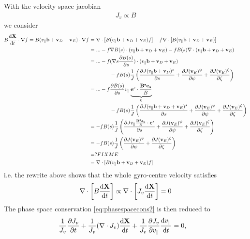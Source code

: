 With the velocity space jacobian
\begin{align}
  J_v \propto B
\end{align}
we consider
\begin{align}
B\frac{\mathrm{d} \mathbf{X}}{\mathrm{d} t}\cdot\nabla f = B ( v_\parallel {\bf b} + {\bf v}_D + {\bf v}_E ) \cdot \nabla f 
&=
\nabla \cdot [ B ( v_\parallel {\bf b} + {\bf v}_D + {\bf v}_E ) f ] - f\nabla \cdot [ B ( v_\parallel {\bf b} + {\bf v}_D + {\bf v}_E )] 
\\
&=
 ... - f\nabla B(s)\cdot ( v_\parallel {\bf b} + {\bf v}_D + {\bf v}_E ) - f B(s)\nabla\cdot ( v_\parallel {\bf b} + {\bf v}_D + {\bf v}_E )
\\
&=
 ... - f(\nabla s\frac{\partial B(s)}{\partial s}) \cdot ( v_\parallel {\bf b} + {\bf v}_D + {\bf v}_E )
\\
&\qquad\qquad
 - fB(s)\frac{1}{J}\left(
\frac{\partial J(v_\parallel {\bf b} + {\bf v}_D)^s}{\partial s} + \frac{\partial J({\bf v}_E)^\psi}{\partial \psi} + \frac{\partial J({\bf v}_E)^\zeta}{\partial \zeta} 
\right) 
\\
&=
 ... - f\frac{\partial B(s)}{\partial s} v_\parallel \underbrace{\mathbf{e}^s\cdot\frac{\mathbf{B^s\mathbf{e}_s}}{B}}_{0}
\\
&\qquad\qquad
 - fB(s)\frac{1}{J}\left(
\frac{\partial J(v_\parallel {\bf b} + {\bf v}_D + \mathbf{v}_E)^s}{\partial s} + \frac{\partial J({\bf v}_E)^\psi}{\partial \psi} + \frac{\partial J({\bf v}_E)^\zeta}{\partial \zeta} 
\right) 
\\
&=
 - fB(s)\frac{1}{J}\left(
\frac{\partial Jv_\parallel \frac{\mathbf{B^s\mathbf{e_s}}}{B}\cdot\mathbf{e}^s}{\partial s} + \frac{\partial J({\bf v}_E)^\psi}{\partial \psi} + \frac{\partial J({\bf v}_E)^\zeta}{\partial \zeta} 
\right) 
\\
&=
 - fB(s)\frac{1}{J}\left(
\frac{\partial J({\bf v}_E)^\psi}{\partial \psi} + \frac{\partial J({\bf v}_E)^\zeta}{\partial \zeta} 
\right) 
\\
&= ? FIXME
\\
&= \nabla \cdot [ B ( v_\parallel {\bf b} + {\bf v}_D + {\bf v}_E ) f ]
\end{align}
i.e. the rewrite above shows that the whole gyro-centre velocity satisfies 
\begin{equation}
 \nabla \cdot \left [ B \frac{\mathrm{d} \bf X}{\mathrm{d} t} \right ] \propto \nabla \cdot \left [ J_v \frac{\mathrm{d} \bf X}{\mathrm{d} t} \right ] = 0
\end{equation}
The phase space conservation \eqref{eq:phasespacecons2} is then reduced to
\begin{align}
  \frac{1 }{ J_v} \frac{\partial J_v}{\partial  t} 
+ \frac{1 }{ J_v} (\nabla \cdot  J_v) \frac{\mathrm{d} \bf X}{\mathrm{d} t} 
 + \frac{1 }{ J_v}\frac{\partial J_v}{\partial  v_\parallel}  \frac{\mathrm{d} v_\parallel}{\mathrm{d}  t} 
 &= 0,
\end{align}
